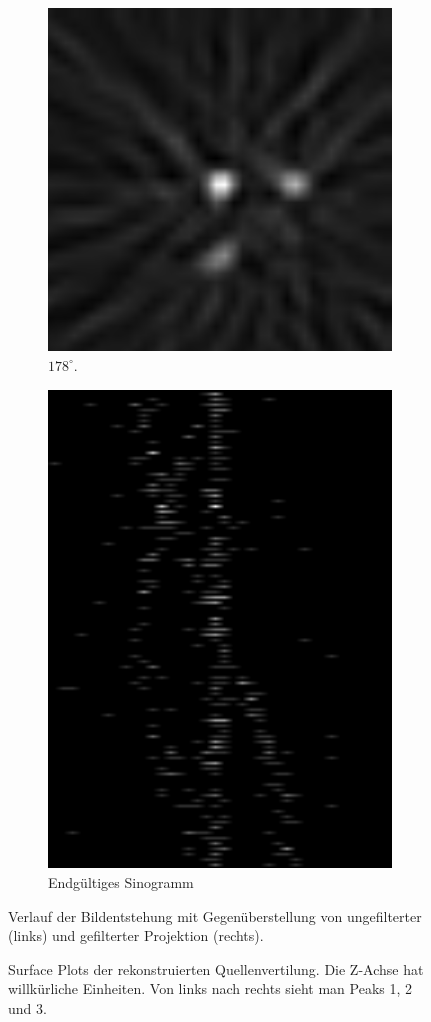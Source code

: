 \documentclass[slug=PET, room=Andreas-Schubert-Bau\,\ 424A, supervisor=Carsten\ Bittrich, coursedate=10.\ 01.\ 2020]{../../Lab_Report_LaTeX/lab_report}
\begin{document}
\begin{figure}[htp]
\begin{subfigure}{0.5\textwidth}
    \includegraphics[width=.4\textwidth]{../messungen/oliTOM1/15_gefiltert.png}
    \caption{\(178^\circ\).}
    \label{eq:tom1-178}
  \end{subfigure}
  \begin{subfigure}{\textwidth}
    \centering
    \includegraphics[width=.3\textwidth, angle=90]{../messungen/oliTOM1/sino.png}
    \caption{Endg\"ultiges Sinogramm}
    \label{fig:tom1-sino}
  \end{subfigure}
  \caption{Verlauf der Bildentstehung mit Gegenüberstellung von
    ungefilterter (links) und gefilterter Projektion (rechts).}
  \label{fig:tom1}
\end{figure}

\begin{figure}[bp]\centering
  
  \caption[Rekonstruierte Quellenverteilung]{Surface Plots der
    rekonstruierten Quellenvertilung. Die Z-Achse hat willk\"urliche
    Einheiten. Von links nach rechts sieht man Peaks 1, 2 und 3.}
  \label{fig:tom1-3dplot}
\end{figure}
\end{document}
